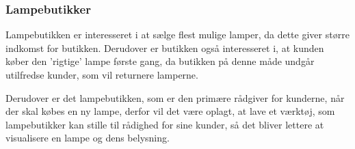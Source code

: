 \subsubsection{Lampebutikker}
Lampebutikken er interesseret i at sælge flest mulige lamper, da dette giver større indkomst for butikken. Derudover er butikken også interesseret i, at kunden køber den 'rigtige' lampe første gang, da butikken på denne måde undgår utilfredse kunder, som vil returnere lamperne. 

Derudover er det lampebutikken, som er den primære rådgiver for kunderne, når der skal købes en ny lampe, derfor vil det være oplagt, at lave et værktøj, som lampebutikker kan stille til rådighed for sine kunder, så det bliver lettere at visualisere en lampe og dens belysning.


